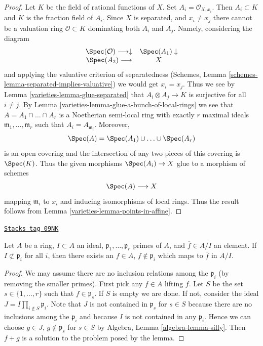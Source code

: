 \begin{proof}

Let $K$ be the field of rational functions of $X$.
Set $A_i = \mathcal{O}_{X, x_i}$. Then $A_i \subset K$ and $K$
is the fraction field of $A_i$. Since $X$ is separated, and
$x_i \not = x_j$ there cannot be a valuation ring $\mathcal{O} \subset K$
dominating both $A_i$ and $A_j$. Namely, considering the
diagram
$$
\begin{array}{cc}\Spec(\mathcal{O}) \longrightarrow\downarrow & \Spec(A_1) \downarrow \\ \Spec(A_2) \longrightarrow & X\end{array}
$$
and applying the valuative criterion of separatedness
(Schemes, Lemma \ref{schemes-lemma-separated-implies-valuative})
we would get $x_i = x_j$. Thus we see by
Lemma \ref{varieties-lemma-glue-separated}
that $A_i \otimes A_j \to K$ is surjective for all $i \not = j$.
By Lemma \ref{varieties-lemma-glue-a-bunch-of-local-rings}
we see that $A = A_1 \cap \ldots \cap A_r$ is a Noetherian
semi-local ring with exactly $r$ maximal ideals
$\mathfrak m_1, \ldots, \mathfrak m_r$ such that $A_i = A_{\mathfrak m_i}$.
Moreover,
$$
\Spec(A) = \Spec(A_1) \cup \ldots \cup \Spec(A_r)
$$
is an open covering and the intersection of any two pieces of this
covering is $\Spec(K)$. Thus the given morphisms $\Spec(A_i) \to X$
glue to a morphism of schemes
$$
\Spec(A) \longrightarrow X
$$
mapping $\mathfrak m_i$ to $x_i$ and inducing isomorphisms of local rings.
Thus the result follows from Lemma \ref{varieties-lemma-points-in-affine}.
\end{proof}

\begin{lemma}
\label{varieties-lemma-extra-silly}
\href{https://stacks.math.columbia.edu/tag/09NK}{\texttt{Stacks tag 09NK}}

Let $A$ be a ring, $I \subset A$ an ideal,
$\mathfrak p_1, \ldots, \mathfrak p_r$ primes of $A$, and
$\overline{f} \in A/I$ an element. If $I \not \subset \mathfrak p_i$
for all $i$, then there exists an $f \in A$, $f \not \in \mathfrak p_i$
which maps to $\overline{f}$ in $A/I$.
\end{lemma}

\begin{proof}
We may assume there are no inclusion relations among the $\mathfrak p_i$
(by removing the smaller primes). First pick any $f \in A$ lifting
$\overline{f}$. Let $S$ be the set $s \in \{1, \ldots, r\}$ such
that $f \in \mathfrak p_s$. If $S$ is empty we are done. If not,
consider the ideal $J = I \prod_{i \not \in S} \mathfrak p_i$.
Note that $J$ is not contained in $\mathfrak p_s$ for $s \in S$
because there are no inclusions among the $\mathfrak p_i$ and because
$I$ is not contained in any $\mathfrak p_i$.
Hence we can choose $g \in J$, $g \not \in \mathfrak p_s$ for
$s \in S$ by Algebra, Lemma \ref{algebra-lemma-silly}.
Then $f + g$ is a solution to the problem posed by the lemma.
\end{proof}

